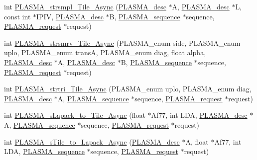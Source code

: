 \begin{DoxyCompactItemize}
\item 
int \hyperlink{group__float__Tile__Async_ga45863a6ca53dd797a98db579bb58583f_ga45863a6ca53dd797a98db579bb58583f}{P\+L\+A\+S\+M\+A\+\_\+strsmpl\+\_\+\+Tile\+\_\+\+Async} (\hyperlink{structplasma__desc__t}{P\+L\+A\+S\+M\+A\+\_\+desc} $\ast$A, \hyperlink{structplasma__desc__t}{P\+L\+A\+S\+M\+A\+\_\+desc} $\ast$L, const int $\ast$I\+P\+I\+V, \hyperlink{structplasma__desc__t}{P\+L\+A\+S\+M\+A\+\_\+desc} $\ast$B, \hyperlink{structplasma__sequence__t}{P\+L\+A\+S\+M\+A\+\_\+sequence} $\ast$sequence, \hyperlink{structplasma__request__t}{P\+L\+A\+S\+M\+A\+\_\+request} $\ast$request)
\item 
int \hyperlink{group__float__Tile__Async_ga7fb1003bbfd4febbb772726766eaae29_ga7fb1003bbfd4febbb772726766eaae29}{P\+L\+A\+S\+M\+A\+\_\+strsmrv\+\_\+\+Tile\+\_\+\+Async} (P\+L\+A\+S\+M\+A\+\_\+enum side, P\+L\+A\+S\+M\+A\+\_\+enum uplo, P\+L\+A\+S\+M\+A\+\_\+enum trans\+A, P\+L\+A\+S\+M\+A\+\_\+enum diag, float alpha, \hyperlink{structplasma__desc__t}{P\+L\+A\+S\+M\+A\+\_\+desc} $\ast$A, \hyperlink{structplasma__desc__t}{P\+L\+A\+S\+M\+A\+\_\+desc} $\ast$B, \hyperlink{structplasma__sequence__t}{P\+L\+A\+S\+M\+A\+\_\+sequence} $\ast$sequence, \hyperlink{structplasma__request__t}{P\+L\+A\+S\+M\+A\+\_\+request} $\ast$request)
\item 
int \hyperlink{group__float__Tile__Async_gaba8ab52eb1dd9bbca882c32faa829efe_gaba8ab52eb1dd9bbca882c32faa829efe}{P\+L\+A\+S\+M\+A\+\_\+strtri\+\_\+\+Tile\+\_\+\+Async} (P\+L\+A\+S\+M\+A\+\_\+enum uplo, P\+L\+A\+S\+M\+A\+\_\+enum diag, \hyperlink{structplasma__desc__t}{P\+L\+A\+S\+M\+A\+\_\+desc} $\ast$A, \hyperlink{structplasma__sequence__t}{P\+L\+A\+S\+M\+A\+\_\+sequence} $\ast$sequence, \hyperlink{structplasma__request__t}{P\+L\+A\+S\+M\+A\+\_\+request} $\ast$request)
\item 
int \hyperlink{group__float__Tile__Async_ga969824bfa635dd2db87ca01ee3a15d00_ga969824bfa635dd2db87ca01ee3a15d00}{P\+L\+A\+S\+M\+A\+\_\+s\+Lapack\+\_\+to\+\_\+\+Tile\+\_\+\+Async} (float $\ast$Af77, int L\+D\+A, \hyperlink{structplasma__desc__t}{P\+L\+A\+S\+M\+A\+\_\+desc} $\ast$A, \hyperlink{structplasma__sequence__t}{P\+L\+A\+S\+M\+A\+\_\+sequence} $\ast$sequence, \hyperlink{structplasma__request__t}{P\+L\+A\+S\+M\+A\+\_\+request} $\ast$request)
\item 
int \hyperlink{group__float__Tile__Async_gab7028085811f206f5206599f0ee8f478_gab7028085811f206f5206599f0ee8f478}{P\+L\+A\+S\+M\+A\+\_\+s\+Tile\+\_\+to\+\_\+\+Lapack\+\_\+\+Async} (\hyperlink{structplasma__desc__t}{P\+L\+A\+S\+M\+A\+\_\+desc} $\ast$A, float $\ast$Af77, int L\+D\+A, \hyperlink{structplasma__sequence__t}{P\+L\+A\+S\+M\+A\+\_\+sequence} $\ast$sequence, \hyperlink{structplasma__request__t}{P\+L\+A\+S\+M\+A\+\_\+request} $\ast$request)
\end{DoxyCompactItemize}



